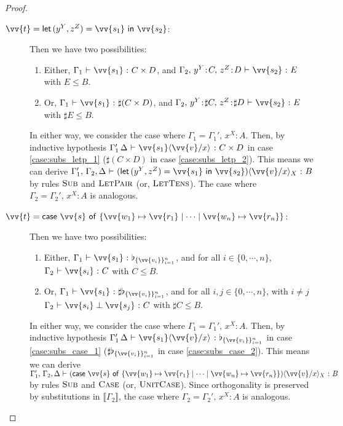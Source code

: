 \documentclass[runningheads,orivec,envcountsame,envcountsect]{llncs}
\newcommand\ansubst[2]{\ensuremath{\langle #1 \rangle_{#2}}}
\def\Pair#1#2{(#1,#2)} %
\def\letkeyword{\mathsf{let}}
\def\inkeyword{\mathsf{in}}
\def\LetP#1#2#3#4#5#6{\letkeyword\,\Pair{#1^{#2}}{#3^{#4}}=#5~\inkeyword~#6}
\def\gencase#1#2#3#4#5{\ensuremath{\mathsf{case}~#1~\mathsf{of}~\{#2\mapsto #4 \mid \dotsb \mid #3\mapsto #5\}}}
\def\sem#1{\llbracket#1\rrbracket}
\def\TYP#1#2#3{#1~{\vdash}~#2~{:}~#3}
\def\SORTH#1#2#3#4{#1~{\vdash}~#2\perp#3~{:}~#4}
\newcommand\basis[1]{\ensuremath{\flat_{#1}}}
\begin{document}
\begin{proof}
\begin{description}
    \item[$\vv{t}=\LetP{y}{Y}{z}{Z}{\vv{s_1}}{\vv{s_2}}$:] Then we have two possibilities:
      \begin{enumerate}
        \item\label{case:subs_letp_1} Either, $\TYP{\Gamma_1}{\vv{s_1}}{C\times D}$, and $\TYP{\Gamma_2,\,y^{Y}\!:\!C,\,z^{Z}\!:\!D}{\vv{s_2}}{E}$ with $E\leq B$.
        \item\label{case:subs_letp_2} Or, $\TYP{\Gamma_1}{\vv{s_1}}{\sharp(C\times D)}$, and $\TYP{\Gamma_2,\,y^{Y}\!:\!\sharp{C},\,z^{Z}\!:\!\sharp{D}}{\vv{s_2}}{E}$ with $\sharp E\leq B$.
      \end{enumerate}
      In either way, we consider the case where $\Gamma_1 = \Gamma_1',\,x^{X}\!:\!A$. Then, by inductive hypothesis $\TYP{\Gamma_1'\,\Delta}{\vv{s_1}\ansubst{\vv{v}/x}{}}{C\times D}$ in case \ref{case:subs_letp_1} ($\sharp (C\times D)$ in case \ref{case:subs_letp_2}). This means we can derive $\TYP{\Gamma_1',\,\Gamma_2,\Delta}{(\LetP{y}{Y}{z}{Z}{\vv{s_1}}{\vv{s_2}})\ansubst{\vv{v}/x}{X}}{B}$ by rules $\textsc{Sub}$ and $\textsc{LetPair}$ (or, $\textsc{LetTens}$). The case where $\Gamma_2 = \Gamma_2',\,x^{X}\!:\!A$ is analogous.

    \item[$\vv{t}=\gencase{\vv{s}}{\vv{w_1}}{\vv{w_n}}{\vv{r_1}}{\vv{r_n}}$:] Then we have two possibilities:
    \begin{enumerate}
      \item\label{case:subs_case_1} Either, $\TYP{\Gamma_1}{\vv{s_1}}{\basis{\{\vv{v_i}\}_{i=1}^n}}$, and for all $i\in\{0,\dotsb,n\}$, $\TYP{\Gamma_2}{\vv{s_i}}{C}$ with $C\leq B$.
      \item\label{case:subs_case_2} Or, $\TYP{\Gamma_1}{\vv{s_1}}{\sharp\basis{\{\vv{v_i}\}_{i=1}^n}}$, and for all $i,j\in\{0,\dotsb,n\}$, with $i\neq j$ $\SORTH{\Gamma_2}{\vv{s_i}}{\vv{s_j}}{C}$ with $\sharp C\leq B$.
    \end{enumerate}
    In either way, we consider the case where $\Gamma_1 = \Gamma_1',\,x^{X}\!:\!A$. Then, by inductive hypothesis $\TYP{\Gamma_1'\,\Delta}{\vv{s_1}\ansubst{\vv{v}/x}{}}{\basis{\{\vv{v_i}\}_{i=1}^n}}$ in case \ref{case:subs_case_1} ($\sharp \basis{\{\vv{v_i}\}_{i=1}^n}$ in case \ref{case:subs_case_2}). This means we can derive $\TYP{\Gamma_1',\,\Gamma_2,\Delta}{(\gencase{\vv{s}}{\vv{w_1}}{\vv{w_n}}{\vv{r_1}}{\vv{r_n}})\ansubst{\vv{v}/x}{X}}{B}$ by rules $\textsc{Sub}$ and $\textsc{Case}$ (or, $\textsc{UnitCase}$). Since orthogonality is preserved by substitutions in $\sem{\Gamma_2}$, the case where $\Gamma_2 = \Gamma_2',\,x^{X}\!:\!A$ is analogous.


\end{description}
\end{proof}
\end{document}
